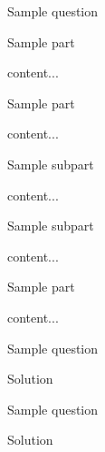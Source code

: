 \documentclass[12pt]{article} %
\begin{document}
	\renewcommand*{\term}{Season 2000} %
	\renewcommand*{\coursecode}{MATH xxx} %
	\renewcommand*{\coursename}{Mathematics Course} %
	\renewcommand*{\assgnnumber}{Assignment \#00} %
	\renewcommand*{\assgnurl}{\url{}}
	\renewcommand*{\studentfname}{FName} %
	\renewcommand*{\studentlname}{LName} %
	\renewcommand*{\studentnum}{SNumber} %
	\renewcommand*{\profname}{ProfFName ProfLName} %
	\renewcommand*{\assistantname}{TAFName TALname} %
	\renewcommand*{\submdate}{00 MONTH 201x} %
	\renewcommand*{\coursesection}{Section 00: 00:00 a.m.} %
	\setfigpath
	\doublespacing
	\insertpictitle
	\pagestyle{printedassignment}
\begin{qstn}[1][][]%
	Sample question
\begin{assgnenum}
	\qitem Sample part
	\begin{soln}
		content...
	\end{soln}
	\qitem Sample part
	\begin{soln}
		content...
	\end{soln}
	\begin{assgnenum}
		\qitem Sample subpart
		\begin{soln}
			content...
		\end{soln}
		\qitem Sample subpart
		\begin{soln}
			content...
		\end{soln}
	\end{assgnenum}
	\qitem Sample part
	\begin{soln}
		content...
	\end{soln}
\end{assgnenum}
\end{qstn}

\begin{qstn}[2][][]
	Sample question
\begin{soln}
	Solution
\end{soln}
\end{qstn}

\begin{qstn}[3][][]
	Sample question
\begin{soln}
	Solution
\end{soln}
\end{qstn}
\end{document}

